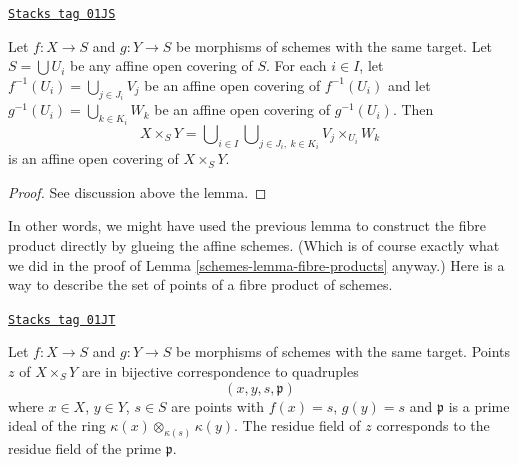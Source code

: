 \begin{lemma}
\label{schemes-lemma-affine-covering-fibre-product}
\href{https://stacks.math.columbia.edu/tag/01JS}{\texttt{Stacks tag 01JS}}


Let $f : X \to S$ and $g : Y \to S$ be morphisms of schemes
with the same target. Let $S = \bigcup U_i$ be any affine open
covering of $S$. For each $i \in I$, let
$f^{-1}(U_i) = \bigcup_{j \in J_i} V_j$ be an affine open covering
of $f^{-1}(U_i)$ and let
$g^{-1}(U_i) = \bigcup_{k \in K_i} W_k$ be an affine open covering
of $g^{-1}(U_i)$. Then
$$
X \times_S Y =
\bigcup\nolimits_{i \in I}
\bigcup\nolimits_{j \in J_i, \ k \in K_i}
V_j \times_{U_i} W_k
$$
is an affine open covering of $X \times_S Y$.
\end{lemma}

\begin{proof}
See discussion above the lemma.
\end{proof}

In other words, we might have used the previous lemma to construct
the fibre product directly by
glueing the affine schemes. (Which is of course exactly
what we did in the proof of Lemma \ref{schemes-lemma-fibre-products} anyway.)
Here is a way to describe the set of points of a fibre product of schemes.

\begin{lemma}
\label{schemes-lemma-points-fibre-product}
\href{https://stacks.math.columbia.edu/tag/01JT}{\texttt{Stacks tag 01JT}}

Let $f : X \to S$ and $g : Y \to S$ be morphisms of schemes
with the same target. Points $z$ of $X \times_S Y$ are in bijective
correspondence to quadruples
$$
(x, y, s, \mathfrak p)
$$
where $x \in X$, $y \in Y$, $s \in S$ are points with
$f(x) = s$, $g(y) = s$ and $\mathfrak p$ is a prime ideal
of the ring $\kappa(x) \otimes_{\kappa(s)} \kappa(y)$.
The residue field of $z$ corresponds to
the residue field of the prime $\mathfrak p$.
\end{lemma}


